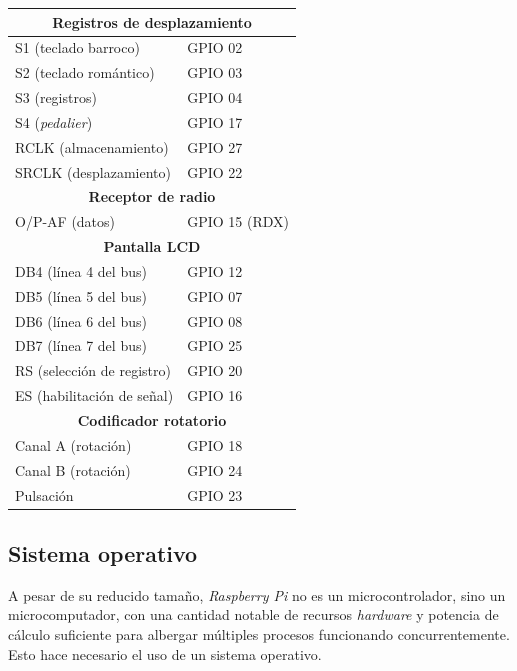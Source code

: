 \begin{center}
	\begin{tabular}{|l|l|}
		\hline \multicolumn{2}{|c|}{\textbf{Registros de desplazamiento}} \\
		\hline S1 (teclado barroco) & \acrshort{GPIO} 02 \\ 
		\hline S2 (teclado romántico) & \acrshort{GPIO} 03 \\ 
		\hline S3 (registros) & \acrshort{GPIO} 04 \\ 
		\hline S4 (\textit{pedalier}) & \acrshort{GPIO} 17 \\ 
		\hline RCLK (almacenamiento) & \acrshort{GPIO} 27 \\ 
		\hline SRCLK (desplazamiento) & \acrshort{GPIO} 22 \\ 
		\hline \multicolumn{2}{|c|}{\textbf{Receptor de radio}} \\
		\hline O/P-AF (datos) & \acrshort{GPIO} 15 (RDX) \\ 
		\hline \multicolumn{2}{|c|}{\textbf{Pantalla \acrshort{LCD}}} \\
		\hline DB4 (línea 4 del bus) & \acrshort{GPIO} 12 \\ 
		\hline DB5 (línea 5 del bus) & \acrshort{GPIO} 07 \\ 
		\hline DB6 (línea 6 del bus) & \acrshort{GPIO} 08 \\ 
		\hline DB7 (línea 7 del bus) & \acrshort{GPIO} 25 \\
		\hline RS (selección de registro) & \acrshort{GPIO} 20 \\ 
		\hline ES (habilitación de señal) & \acrshort{GPIO} 16 \\ 
		\hline \multicolumn{2}{|c|}{\textbf{Codificador rotatorio}} \\
		\hline Canal A (rotación) & \acrshort{GPIO} 18 \\ 
		\hline Canal B (rotación) & \acrshort{GPIO} 24 \\ 
		\hline Pulsación & \acrshort{GPIO} 23 \\ 
		\hline 
	\end{tabular}
	\smallskip
\end{center}

\smallskip

\subsection{Sistema operativo}

A pesar de su reducido tamaño, \textit{Raspberry Pi} no es un microcontrolador, sino un microcomputador, con una cantidad notable de recursos \textit{hardware} y potencia de cálculo suficiente para albergar múltiples procesos funcionando concurrentemente. Esto hace necesario el uso de un sistema operativo.

